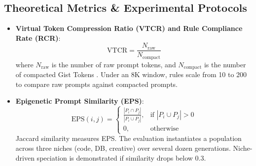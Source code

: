 \documentclass[10pt,journal,compsoc]{IEEEtran}
\begin{document}
\subsection{Theoretical Metrics \& Experimental Protocols}
\begin{itemize}
    \item \textbf{Virtual Token Compression Ratio (VTCR) and Rule Compliance Rate (RCR)}:
    \begin{equation}
    \text{VTCR} = \frac{N_{\text{raw}}}{N_{\text{compact}}}
    \end{equation}
    where $N_{\text{raw}}$ is the number of raw prompt tokens, and $N_{\text{compact}}$ is the number of compacted Gist Tokens \cite{mu2023}. Under an 8K window, rules scale from 10 to 200 to compare raw prompts against compacted prompts.
    
    \item \textbf{Epigenetic Prompt Similarity (EPS)}:
    \begin{equation}
    \text{EPS}(i, j) = \begin{cases} 
    \frac{|P_i \cap P_j|}{|P_i \cup P_j|}, & \text{if } |P_i \cup P_j| > 0 \\ 
    0, & \text{otherwise} 
    \end{cases}
    \end{equation}
    Jaccard similarity measures EPS. The evaluation instantiates a population across three niches (code, DB, creative) over several dozen generations. Niche-driven speciation is demonstrated if similarity drops below 0.3.
    

\end{itemize}
\end{document}
